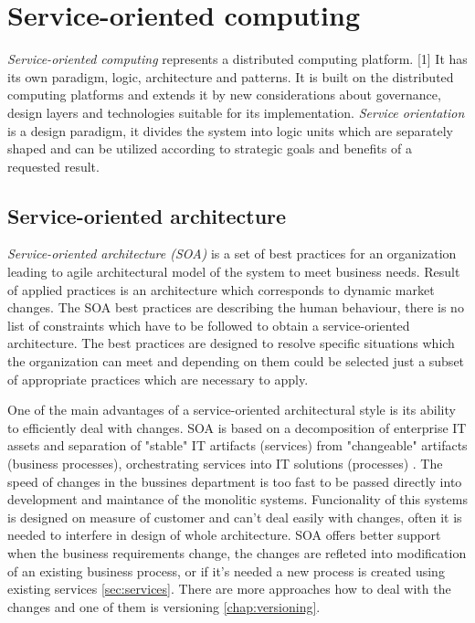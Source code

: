 \chapter{Service-oriented computing}
\label{chap:service-oriented computing}
\emph{Service-oriented computing} represents a distributed computing platform. [1] It has its own paradigm, logic, architecture and patterns. It is built on the distributed computing platforms and extends it by new considerations about governance, design layers and technologies suitable for its implementation.
\emph{Service orientation} is a design paradigm, it divides the system into logic units which are separately shaped and can be utilized according to strategic goals and benefits of a requested result.

\section{Service-oriented architecture}
\emph{Service-oriented architecture (SOA)} is a set of best practices for an organization leading to agile architectural model of the system to meet business needs. Result of applied practices is an architecture which corresponds to dynamic market changes. The SOA best practices are describing the human behaviour, there is no list of constraints which have to be followed to obtain a service-oriented architecture. The best practices are designed to resolve specific situations which the organization can meet and depending on them could be selected just a subset of appropriate practices which are necessary to apply.

One of the main advantages of a service-oriented architectural style is its ability to efficiently deal with changes. SOA is based on a decomposition of enterprise IT assets and separation of "stable" IT artifacts (services) from "changeable" artifacts (business processes), orchestrating services into IT solutions (processes) \cite{website:versioning-in-soa}. %
The speed of changes in the bussines department is too fast to be passed directly into development and maintance of the monolitic systems. Funcionality of this systems is designed on measure of customer and can't deal easily with changes, often it is needed to interfere in design of whole architecture. SOA offers better support when the business requirements change, the changes are refleted into modification of an existing business process, or if it's needed a new process is created using existing services \ref{sec:services}. There are more approaches how to deal with the changes and one of them is versioning \ref{chap:versioning}.


